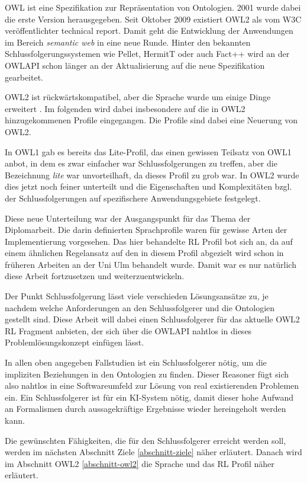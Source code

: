 OWL ist eine Spezifikation zur Repräsentation von Ontologien. 2001 wurde dabei die erste Version herausgegeben. Seit Oktober 2009 existiert OWL2 als vom W3C veröffentlichter technical report. Damit geht die Entwicklung der Anwendungen im Bereich \emph{semantic web} in eine neue Runde. Hinter den bekannten Schlussfolgerungssystemen wie Pellet, HermitT oder auch Fact++ wird an der OWLAPI schon länger an der Aktualisierung auf die neue Spezifikation gearbeitet.

OWL2 ist rückwärtskompatibel, aber die Sprache wurde um einige Dinge erweitert \cite{Golbreich2008}. Im folgenden wird dabei  insbesondere auf die in OWL2 hinzugekommenen Profile eingegangen. Die Profile sind dabei eine Neuerung von OWL2.

In OWL1 gab es bereits das Lite-Profil, das einen gewissen Teilsatz von OWL1 anbot, in dem es zwar einfacher war Schlussfolgerungen zu treffen, aber die Bezeichnung \emph{lite} war unvorteilhaft, da dieses Profil zu grob war. In OWL2 wurde dies jetzt noch feiner unterteilt und die Eigenschaften und Komplexitäten bzgl. der Schlussfolgerungen auf spezifischere Anwendungsgebiete festgelegt.

Diese neue Unterteilung war der Ausgangspunkt für das Thema der Diplomarbeit. Die darin definierten Sprachprofile waren für gewisse Arten der Implementierung vorgesehen. Das hier behandelte RL Profil bot sich an, da auf einem ähnlichen Regelansatz auf den in diesem Profil abgezielt wird schon in früheren Arbeiten an der Uni Ulm behandelt wurde. Damit war es nur natürlich diese Arbeit fortzusetzen und weiterzuentwickeln.

Der Punkt Schlussfolgerung lässt viele verschieden Lösungsansätze zu, je nachdem welche Anforderungen an den Schlussfolgerer und die Ontologien gestellt sind. Diese Arbeit will dabei einen Schlussfolgerer für das aktuelle  OWL2 RL Fragment anbieten, der sich über die OWLAPI nahtlos in dieses Problemlösungskonzept einfügen lässt.

In allen oben angegeben Fallstudien ist ein Schlussfolgerer nötig, um die impliziten Beziehungen in den Ontologien zu finden. Dieser Reasoner fügt sich also nahtlos in eine Softwareumfeld zur Lösung von real existierenden Problemen ein. Ein Schlussfolgerer ist für ein KI-System nötig, damit dieser hohe Aufwand an Formalismen durch aussagekräftige Ergebnisse wieder hereingeholt werden kann.

Die gewünschten Fähigkeiten, die für den Schlussfolgerer erreicht werden soll, werden im nächsten Abschnitt Ziele \ref{abschnitt-ziele} näher erläutert. Danach wird im Abschnitt OWL2 \ref{abschnitt-owl2} die Sprache und das RL Profil näher erläutert.

